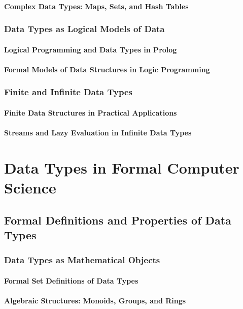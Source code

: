 \documentclass[12pt, oneside]{book}
\begin{document}
\subsubsection{Complex Data Types: Maps, Sets, and Hash Tables}
\subsection{Data Types as Logical Models of Data}
\subsubsection{Logical Programming and Data Types in Prolog}
\subsubsection{Formal Models of Data Structures in Logic Programming}
\subsection{Finite and Infinite Data Types}
\subsubsection{Finite Data Structures in Practical Applications}
\subsubsection{Streams and Lazy Evaluation in Infinite Data Types}

\chapter{Data Types in Formal Computer Science}
\section{Formal Definitions and Properties of Data Types}
\subsection{Data Types as Mathematical Objects}
\subsubsection{Formal Set Definitions of Data Types}
\subsubsection{Algebraic Structures: Monoids, Groups, and Rings}
\end{document}
